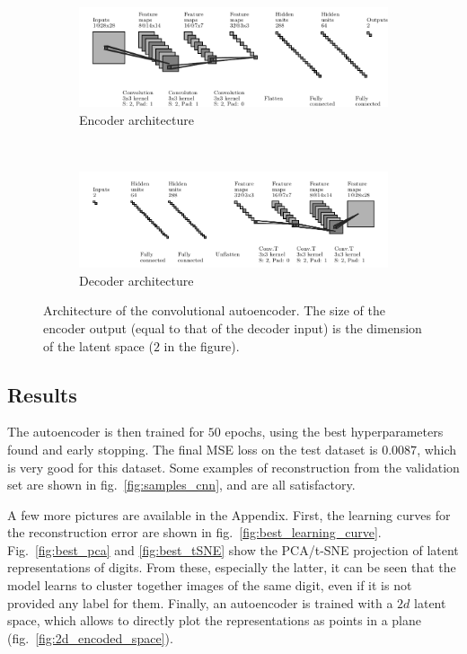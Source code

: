 \documentclass[11pt,a4paper]{scrartcl}
\begin{document}
\begin{figure}[H]
    \centering
    \begin{subfigure}[t]{0.9\textwidth}
        \centering
        \includegraphics[width=\textwidth]{Images/encoder_fig}
        \caption{Encoder architecture}
    \end{subfigure}\\

    \begin{subfigure}[t]{0.9\textwidth}
        \centering
        \includegraphics[width=\textwidth]{Images/decoder_fig}
        \caption{Decoder architecture}
    \end{subfigure}%
    \caption{Architecture of the convolutional autoencoder. The size of the encoder output (equal to that of the decoder input) is the dimension of the latent space ($2$ in the figure). \label{fig:cnn_architecture}}
\end{figure}


\subsection{Results}
The autoencoder is then trained for $50$ epochs, using the best hyperparameters found and early stopping. The final MSE loss on the test dataset is $0.0087$, which is very good for this dataset. Some examples of reconstruction from the validation set are shown in fig.~\ref{fig:samples_cnn}, and are all satisfactory. 

\medskip

A few more pictures are available in the Appendix. First, the learning curves for the reconstruction error are shown in fig.~\ref{fig:best_learning_curve}. Fig.~\ref{fig:best_pca} and \ref{fig:best_tSNE} show the PCA/t-SNE projection of latent representations of digits. From these, especially the latter, it can be seen that the model learns to cluster together images of the same digit, even if it is not provided any label for them. Finally, an autoencoder is trained with a $2d$ latent space, which allows to directly plot the representations as points in a plane (fig.~\ref{fig:2d_encoded_space}). 
\end{document}
